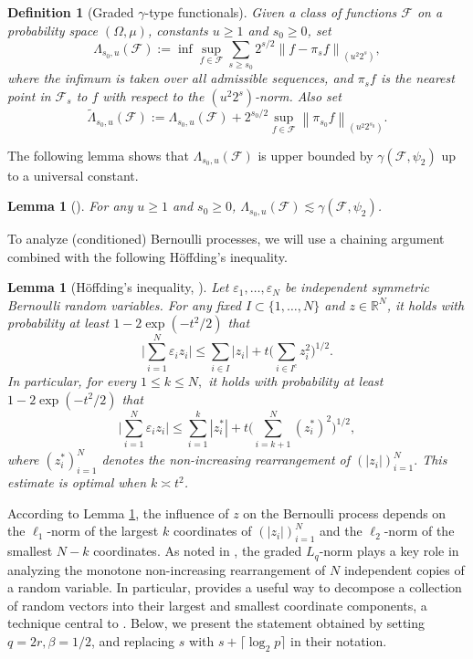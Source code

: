 \documentclass[numbers,webpdf,imaiai]{ima-authoring-template}
\theoremstyle{thmstyletwo}%
\newtheorem{definition}{Definition}
\newtheorem{lemma}[theorem]{Lemma}
\numberwithin{equation}{section}
\numberwithin{equation}{section}
\newcommand{\F}{\mathcal{F}}
\begin{document}
\begin{definition}[Graded $\gamma$-type functionals]
Given a class of functions $\F$ on a probability space $(\Omega, \mu)$, constants $u \geq 1$ and $s_0 \geq 0$, set
\[
\Lambda_{s_0, u}(\F) :=\inf \sup _{f \in \F} \sum_{s \geq s_0} 2^{s / 2}\left\|f-\pi_s f\right\|_{(u^2 2^s)},
\]
where the infimum is taken over all admissible sequences, and $\pi_s f$ is the nearest point in $\F_s$ to $f$ with respect to the $(u^2 2^s)$-norm. Also set
\[
\widetilde{\Lambda}_{s_0, u}(\F) :=\Lambda_{s_0, u}(\F)+2^{s_0 / 2} \sup_{f \in \F}\left\|\pi_{s_0} f\right\|_{(u^2 2^{s_0})} .
\]
\end{definition} 

 The following lemma shows that $\Lambda_{s_0, u}(\F)$ is upper bounded by $\gamma(\F,\psi_2)$ up to a universal constant.
\begin{lemma}[{\cite[Lemma 4.1]{al2025sharp}}]\label{lemma:Lambda_Gamma}
    For any $u\ge 1$ and $s_0\ge 0$, $\Lambda_{s_0,u}(\F)\lesssim \gamma(\F,\psi_2)$.
\end{lemma}

To analyze (conditioned) Bernoulli processes, we will use a chaining argument combined with the following H\"offding’s inequality.

\begin{lemma}[H\"offding's inequality, \cite{montgomery1990distribution}]\label{lemma:Hoffding} Let $\varepsilon_1,\ldots,\varepsilon_N$ be independent symmetric Bernoulli random variables. For any fixed $I \subset\{1, \ldots, N\}$ and $z \in \mathbb{R}^N$, it holds with probability at least $1-2 \exp (-t^2 / 2 )$ that
\[
\bigg|\sum_{i=1}^N \varepsilon_i z_i\bigg| \le \sum_{i \in I}\left|z_i\right|+t\bigg(\sum_{i \in I^c} z_i^2\bigg)^{1 / 2}.
\]
In particular, for every $1 \le k \le N,$ it holds with probability at least $1-2 \exp (-t^2 / 2 )$ that
\[
\bigg|\sum_{i=1}^N \varepsilon_i z_i\bigg| 
\le \sum_{i=1}^k \left|z_i^*\right|+t\bigg(\sum_{i=k+1}^N (z_i^*)^2\bigg)^{1 / 2},
\]
where $\left(z_i^*\right)_{i=1}^N$ denotes the non-increasing rearrangement of $\left(\left|z_i\right|\right)_{i=1}^N.$ This estimate is optimal when $k\asymp t^2$.
\end{lemma}


According to Lemma \ref{lemma:Hoffding}, the influence of $z$ on the Bernoulli process depends on the $\ell_1$-norm of the largest $k$ coordinates of $(|z_i|)_{i=1}^{N}$ and the $\ell_2$-norm of the smallest $N-k$ coordinates. As noted in \cite{mendelson2016upper}, the graded $L_q$-norm plays a key role in analyzing the monotone non-increasing rearrangement of $N$ independent copies of a random variable. In particular, \cite[Corollary 3.6]{mendelson2016upper} provides a useful way to decompose a collection of random vectors into their largest and smallest coordinate components, a technique central to \cite{mendelson2016upper}. Below, we present the statement obtained by setting $q=2r, \beta=1/2$, and replacing $s$ with $s+\lceil \log_2 p \rceil$ in their notation.
\end{document}
